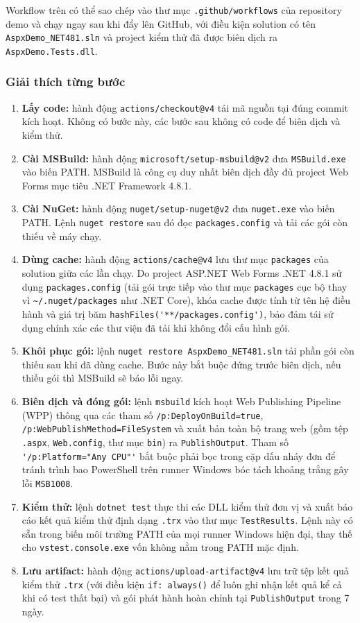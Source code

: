 Workflow trên có thể sao chép vào thư mục \verb|.github/workflows| của repository demo
và chạy ngay sau khi đẩy lên GitHub, với điều kiện solution có tên \verb|AspxDemo_NET481.sln|
và project kiểm thử đã được biên dịch ra \verb|AspxDemo.Tests.dll|.

\subsubsection{Giải thích từng bước}
\begin{enumerate}
\item \textbf{Lấy code:} hành động \verb|actions/checkout@v4| tải mã nguồn tại đúng commit kích hoạt.
Không có bước này, các bước sau không có code để biên dịch và kiểm thử.
\item \textbf{Cài MSBuild:} hành động \verb|microsoft/setup-msbuild@v2| đưa \verb|MSBuild.exe| vào biến PATH.
MSBuild là công cụ duy nhất biên dịch đầy đủ project Web Forms mục tiêu .NET Framework 4.8.1.
\item \textbf{Cài NuGet:} hành động \verb|nuget/setup-nuget@v2| đưa \verb|nuget.exe| vào biến PATH.
Lệnh \verb|nuget restore| sau đó đọc \verb|packages.config| và tải các gói còn thiếu về máy chạy.
\item \textbf{Dùng cache:} hành động \verb|actions/cache@v4| lưu thư mục \verb|packages| của solution giữa các lần chạy.
Do project ASP.NET Web Forms .NET 4.8.1 sử dụng \verb|packages.config| (tải gói trực tiếp vào thư mục \verb|packages| cục bộ thay vì \verb|~/.nuget/packages| như .NET Core), khóa cache được tính từ tên hệ điều hành và giá trị băm \verb|hashFiles('**/packages.config')|, bảo đảm tái sử dụng chính xác các thư viện đã tải khi không đổi cấu hình gói.
\item \textbf{Khôi phục gói:} lệnh \verb|nuget restore AspxDemo_NET481.sln| tải phần gói còn thiếu sau khi đã dùng cache.
Bước này bắt buộc đứng trước biên dịch, nếu thiếu gói thì MSBuild sẽ báo lỗi ngay.
\item \textbf{Biên dịch và đóng gói:} lệnh \verb|msbuild| kích hoạt Web Publishing Pipeline (WPP) thông qua các tham số \verb|/p:DeployOnBuild=true|, \verb|/p:WebPublishMethod=FileSystem| và xuất bản toàn bộ trang web (gồm tệp \verb|.aspx|, \verb|Web.config|, thư mục \verb|bin|) ra \verb|PublishOutput|. Tham số \verb|'/p:Platform="Any CPU"'| bắt buộc phải bọc trong cặp dấu nháy đơn để tránh trình bao PowerShell trên runner Windows bóc tách khoảng trắng gây lỗi \verb|MSB1008|.
\item \textbf{Kiểm thử:} lệnh \verb|dotnet test| thực thi các DLL kiểm thử đơn vị và xuất báo cáo kết quả kiểm thử định dạng \verb|.trx| vào thư mục \verb|TestResults|. Lệnh này có sẵn trong biến môi trường PATH của mọi runner Windows hiện đại, thay thế cho \verb|vstest.console.exe| vốn không nằm trong PATH mặc định.
\item \textbf{Lưu artifact:} hành động \verb|actions/upload-artifact@v4| lưu trữ tệp kết quả kiểm thử \verb|.trx| (với điều kiện \verb|if: always()| để luôn ghi nhận kết quả kể cả khi có test thất bại) và gói phát hành hoàn chỉnh tại \verb|PublishOutput| trong 7 ngày.
\end{enumerate}

